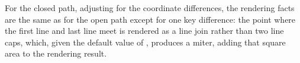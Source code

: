 \pnum
For the closed path, adjusting for the coordinate differences, the rendering facts are the same as for the open path except for one key difference: the point where the first line and last line meet is rendered as a line join rather than two line caps, which, given the default value of , produces a miter, adding that square area to the rendering result.

%
%  
%
%
